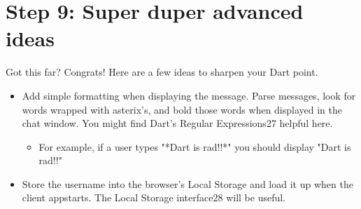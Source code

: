 \section{Step 9: Super duper advanced ideas}

Got this far? Congrats! Here are a few ideas to sharpen your Dart point.

\begin{itemize}
\item Add simple formatting when displaying the message. Parse messages, look for words wrapped with asterix’s, and bold those words when displayed in the chat window. You might find Dart’s Regular Expressions27 helpful here.
\begin{itemize}
\item For example, if a user types "*Dart is rad!!*" you should display "Dart is rad!!"
\end{itemize}
\item Store the username into the browser’s Local Storage and load it up when the client appstarts. The Local Storage interface28 will be useful.
\end{itemize}
